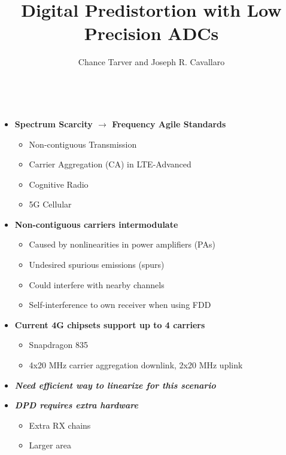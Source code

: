 \documentclass[25pt]{tikzposter} %
\title{\bf Digital Predistortion with Low Precision ADCs}
\institute{Rice University} %
\author{Chance Tarver and Joseph R. Cavallaro}
\begin{document}
\maketitle %

\begin{columns} %
\centering
{} %
{    \Large
\begin{itemize}
     \item {\bf Spectrum Scarcity $\rightarrow$ Frequency Agile Standards}
            \begin{itemize}
                \item Non-contiguous Transmission
                \item Carrier Aggregation (CA) in LTE-Advanced
                \item Cognitive Radio
                \item 5G Cellular
            \end{itemize}
        \item {\bf Non-contiguous carriers intermodulate}
        \begin{itemize}
            \item Caused by nonlinearities in power amplifiers (PAs)
            \item Undesired spurious emissions (spurs)
            \item Could interfere with nearby channels
            \item Self-interference to own receiver when using FDD
        \end{itemize}
        \item{\bf Current 4G chipsets support up to 4 carriers}
            \begin{itemize}
                \item Snapdragon 835
                \item 4x20 MHz carrier aggregation downlink, 2x20 MHz uplink
            \end{itemize}
            \vspace{1mm}
        \item{\textbf{\textit{ Need efficient way to linearize for this scenario}}}
        \item{\textbf{\textit{ DPD requires extra hardware}}}
        	\begin{itemize}
        		\item Extra RX chains
        		\item Larger area 

\end{itemize}
\end{itemize}}
\end{columns}
\end{document}
